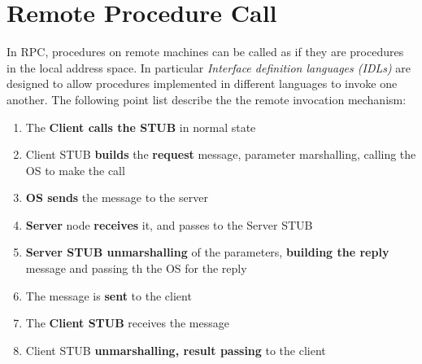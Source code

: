 \section{Remote Procedure Call}
In RPC, procedures on remote machines can be called as if they are procedures in the local address space. In particular \textit{Interface definition languages (IDLs)} are designed to allow procedures implemented in different languages to invoke one another. The following point list describe the the remote invocation mechanism:
\begin{enumerate}
    \item The \textbf{Client calls the STUB} in normal state
    \item Client STUB \textbf{builds} the \textbf{request} message, parameter marshalling, calling the OS to make the call
    \item \textbf{OS sends} the message to the server
    \item \textbf{Server} node \textbf{receives} it, and passes to the Server STUB
    \item \textbf{Server STUB unmarshalling} of the parameters, \textbf{building the reply} message and passing th the OS for the reply
    \item The message is \textbf{sent} to the client
    \item The \textbf{Client STUB} receives the message
    \item Client STUB \textbf{unmarshalling, result passing} to the client
\end{enumerate}

